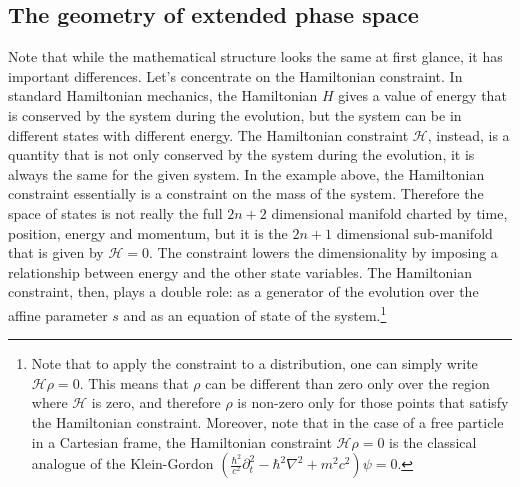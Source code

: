 \subsection{The geometry of extended phase space}

Note that while the mathematical structure looks the same at first glance, it has important differences. Let's concentrate on the Hamiltonian constraint. In standard Hamiltonian mechanics, the Hamiltonian $H$ gives a value of energy that is conserved by the system during the evolution, but the system can be in different states with different energy. The Hamiltonian constraint $\mathcal{H}$, instead, is a quantity that is not only conserved by the system during the evolution, it is always the same for the given system. In the example above, the Hamiltonian constraint essentially is a constraint on the mass of the system. Therefore the space of states is not really the full $2n+2$ dimensional manifold charted by time, position, energy and momentum, but it is the $2n+1$ dimensional sub-manifold that is given by $\mathcal{H}=0$. The constraint lowers the dimensionality by imposing a relationship between energy and the other state variables. The Hamiltonian constraint, then, plays a double role: as a generator of the evolution over the affine parameter $s$ and as an equation of state of the system.\footnote{Note that to apply the constraint to a distribution, one can simply write $\mathcal{H} \rho = 0$. This means that $\rho$ can be different than zero only over the region where $\mathcal{H}$ is zero, and therefore $\rho$ is non-zero only for those points that satisfy the Hamiltonian constraint. Moreover, note that in the case of a free particle in a Cartesian frame, the Hamiltonian constraint $\mathcal{H} \rho = 0$ is the classical analogue of the Klein-Gordon $\left( \frac{\hbar^2}{c^2} \partial_t^2 - \hbar^2 \nabla^2 + m^2c^2 \right) \psi = 0$.}

